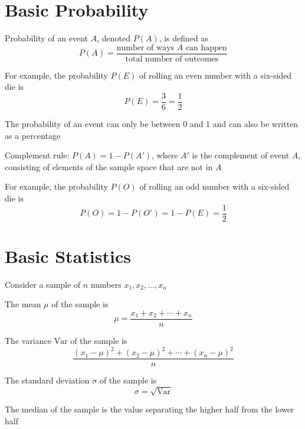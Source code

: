 \documentclass[8pt,a4paper,compress]{beamer}
\begin{document}
\section{Basic Probability}
\begin{frame}[fragile]
\pause

Probability of an event $A$, denoted $P(A)$, is defined as $$P(A) = \frac{\text{number of ways } A \text{ can happen}}{\text{total number of outcomes}}$$

\pause\bigskip

For example, the probability $P(E)$ of rolling an even number with a six-sided die is $$P(E) = \frac{3}{6} = \frac{1}{2}$$

\pause\bigskip

The probability of an event can only be between 0 and 1 and can also be written as a percentage

\pause\bigskip

Complement rule: $P(A) = 1 - P(A')$, where $A'$ is the complement of event $A$, consisting of elements of the sample space that are not in $A$

\pause\bigskip

For example, the probability $P(O)$ of rolling an odd number with a six-sided die is $$P(O) = 1 - P(O') = 1 - P(E) = \frac{1}{2}$$
\end{frame}

\section{Basic Statistics}
\begin{frame}[fragile]
\pause

Consider a sample of $n$ numbers $x_1, x_2, \dots, x_n$

\pause\bigskip

The mean $\mu$ of the sample is $$\mu = \frac{x_1 + x_2 + \cdots + x_n}{n}$$

\pause\bigskip

The variance $\text{Var}$ of the sample is $$\frac{(x_1 - \mu)^2 + (x_2 - \mu)^2 + \cdots + (x_n - \mu)^2}{n}$$

\pause\bigskip

The standard deviation $\sigma$ of the sample is $$\sigma = \sqrt{\text{Var}}$$

\pause\bigskip

The median of the sample is the value separating the higher half from the lower half
\end{frame}
\end{document}
